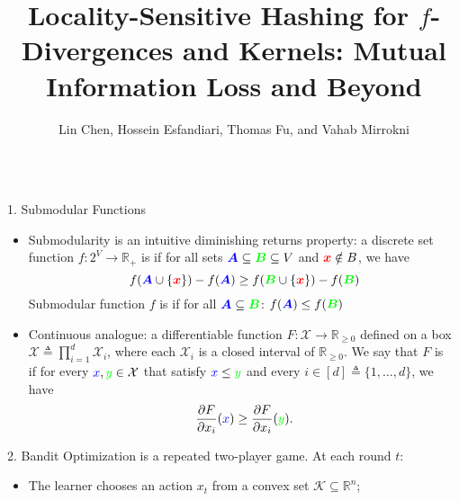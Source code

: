 \documentclass[final]{beamer}
\title{Locality-Sensitive Hashing for $f$-Divergences and \kr Kernels: 
	Mutual 
	Information Loss and Beyond}
\author{Lin Chen\inst{1,2}, 
	Hossein Esfandiari\inst{1},
	Thomas Fu\inst{1}, and
	Vahab Mirrokni\inst{1}
	 \vspace{10pt}}
\institute{{  \inst{1}Google Research, \inst{2}Yale University }\vspace{10pt}}
\newcommand{\constraint}{\mathcal{K}}
\newlength{\onecolwid}
\begin{document}
	
	
	
	\begin{frame}[t] %
	\begin{columns}[t] %
	\begin{column}{\onecolwid} %
			\vspace{-40pt}
				
			\begin{block}{1. Submodular Functions}			
			\begin{itemize}
%
%
				
				\item 	Submodularity is an intuitive diminishing returns 
				property: 
				a discrete set function $f:2^{V} \rightarrow \mathbb{R}_{+} $ is  if for all sets $\textcolor{blue}{\bm{A}} \subseteq \textcolor{green}{\bm{B}} \subseteq V$
				and $ \textcolor{red}{\bm{x}} \notin B$, we have
				\[	 f(\textcolor{blue}{\bm{A}}  \cup \{ \textcolor{red}{\bm{x}}\}) - f(\textcolor{blue}{\bm{A}} ) \geq f(\textcolor{green}{\bm{B}} \cup \{ \textcolor{red}{\bm{x}}\}) - f(\textcolor{green}{\bm{B}})
				\]
%					
%					 
				Submodular function $f$ is  if for all $\textcolor{blue}{\bm{A}} \subseteq \textcolor{green}{\bm{B}} $:
				$f(\textcolor{blue}{\bm{A}}) \leq f(\textcolor{green}{\bm{B}})$
				
				\item  Continuous analogue: a 
				differentiable function $F:\mathcal{X}\to \mathbb{R}_{\ge 0}$ 
				defined on a box $\mathcal{X}\triangleq 
				\prod_{i=1}^d 
				\mathcal{X}_i$, where each $\mathcal{X}_i$ is a closed interval 
				of 
				$\mathbb{R}_{\ge 0}$. We say that $F$ is 
				~\citep{bian16guaranteed} if for 
				every $\textcolor{blue}{x},\textcolor{green}{y}\in \mathcal{X}$ 
				that satisfy $\textcolor{blue}{x} 
				\leq \textcolor{green}{y}$ and every 
				$i\in 
				[d]\triangleq \{1,\dots, d\}$, we have 
				$$\frac{\partial F}{\partial x_i}(\textcolor{blue}{x}) \geq 
				\frac{\partial 
				F}{\partial 
					x_i}(\textcolor{green}{y}).$$
			\end{itemize}
		\end{block}
			
		
	\begin{block}{2. Bandit Optimization}
			 is a repeated two-player 
			game. At each round 
			$t$:
			\begin{itemize}
				\item The learner chooses an action $x_t$ from a convex set 
				$\constraint\subseteq \mathbb{R}^n$;
				

\end{itemize}
\end{block}
\end{column}
\end{columns}
\end{frame}
\end{document}
